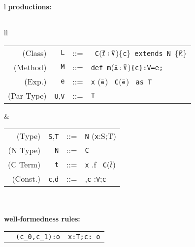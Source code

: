 
\begin{figure*}
\footnotesize
\begin{tabular}{l}
{\bf \FX{} productions:} \\
\quad\\
\begin{tabular}{ll}
\begin{tabular}{r@{\quad}rcl}
  (Class) & {\tt L} &{::=}& \klass\ {\tt C}($\bar{\tt f}:\bar{\tt V}$)\{{\tt c}\}\ {\tt extends}\ {\tt N}\ \{$\bar{\tt M}$\} \\
  (Method)& {\tt M} &{::=}& {\tt def}\ {\tt m}($\bar{\tt x}:\bar{\tt V}$){\tt \{c\}:V=e;}\\
  (Exp.)& {\tt e} &{::=}& {\tt x} \alt \this \alt {\tt e.f} \alt {\tt e.m}($\bar{\tt e}$) 
   \alt \new\ {\tt C}($\bar{\tt e}$) \alt {\tt e}\ \mbox{{\tt as} {\tt T}} \\ 
  (Par Type) & {\tt U},{\tt V}&{::=} & {\tt T} \\
\end{tabular} 
&
\begin{tabular}{r@{\quad}rcl}
  (Type)& {\tt S},{\tt T}&{::=}& {\tt N} \alt {\tt T\{c\}} \alt ({\tt x}:S;T)\\
  (N Type) & {\tt N}&{::=}& {\tt C} \alt {\tt N\{c\}}\\
  (C Term) & {\tt t} &{::=}& {\tt x} \alt \self \alt \this \alt {\tt t}.f \alt \new\ {\tt C}($\bar{t}$)\\
  (Const.) & {\tt c},{\tt d} &{::=}&\true \alt {\tt t==t} \alt {\tt c},{\tt c} \alt {\tt x}:{\tt V};{\tt c}\\
\end{tabular} 
\end{tabular}
\quad \\
\quad\\
{\bf \FX{} well-formedness rules:}\\
{\tabcolsep=0pt
\begin{tabular}{p{}p{}p{}}
\infax[True]{\Gamma \vdash {\tt true}: {\tt o}}
&
\infrule[And]
	{\Gamma\tt  \vdash c_0: o \andalso \Gamma \vdash c_1: o}
	{\Gamma\tt \vdash (c_0,c_1):o}
&
\infrule[Exists]
	{\Gamma\tt \vdash t: T \andalso \Gamma \vdash c[t/x]:o}
	{\Gamma\tt \vdash x:T;c: o}
\\
\end{tabular}}
\quad\\
{\tabcolsep=0pt
\begin{tabular}{p{}p{}p{}}

\end{tabular}}
\end{tabular}
\end{figure*}
